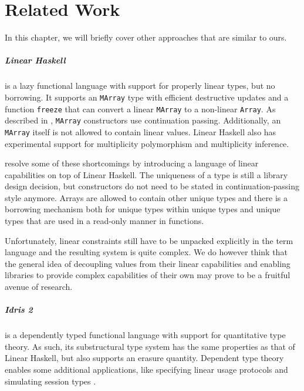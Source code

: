 \chapter{Related Work}\label{sec:relatedwork}
In this chapter, we will briefly cover other approaches that are similar to ours.

\paragraph{Linear Haskell} is a lazy functional language with support for properly linear types, but no borrowing. It supports an \lstinline|MArray| type with efficient destructive updates and a function \lstinline|freeze| that can convert a linear \lstinline|MArray| to a non-linear \lstinline|Array|. As described in , \lstinline|MArray| constructors use continuation passing. Additionally, an \lstinline|MArray| itself is not allowed to contain linear values. Linear Haskell also has experimental support for multiplicity polymorphism and multiplicity inference.

\cite{spiwack_linearly_2022} resolve some of these shortcomings by introducing a language of linear capabilities on top of Linear Haskell. The uniqueness of a type is still a library design decision, but constructors do not need to be stated in continuation-passing style anymore. Arrays are allowed to contain other unique types and there is a borrowing mechanism both for unique types within unique types and unique types that are used in a read-only manner in functions. 

Unfortunately, linear constraints still have to be unpacked explicitly in the term language and the resulting system is quite complex. We do however think that the general idea of decoupling values from their linear capabilities and enabling libraries to provide complex capabilities of their own may prove to be a fruitful avenue of research.

\paragraph{Idris 2 \citep{brady_idris_2021}} is a dependently typed functional language with support for quantitative type theory. As such, its substructural type system has the same properties as that of Linear Haskell, but also supports an erasure quantity. Dependent type theory enables some additional applications, like specifying linear usage protocols and simulating session types \citep{honda_types_1993}.

